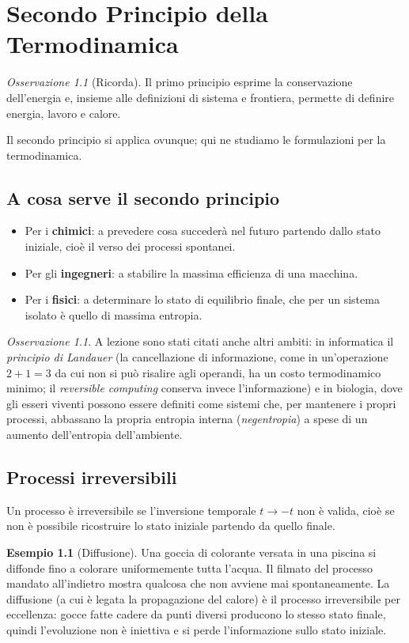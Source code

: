 \documentclass[11pt, a4paper, openright]{book}
\theoremstyle{plain}
\theoremstyle{definition}
\newtheorem{esempio}[teorema]{Esempio}
\theoremstyle{remark}
\newtheorem{osservazione}[teorema]{Osservazione}
\begin{document}
\chapter{Secondo Principio della Termodinamica}
\begin{osservazione}[Ricorda]
    Il primo principio esprime la conservazione dell'energia e, insieme alle definizioni di sistema e frontiera, permette di definire energia, lavoro e calore.
\end{osservazione}
Il secondo principio si applica ovunque; qui ne studiamo le formulazioni per la termodinamica.

\section{A cosa serve il secondo principio}
\begin{itemize}
    \item Per i \textbf{chimici}: a prevedere cosa succederà nel futuro partendo dallo stato iniziale, cioè il verso dei processi spontanei.
    \item Per gli \textbf{ingegneri}: a stabilire la massima efficienza di una macchina.
    \item Per i \textbf{fisici}: a determinare lo stato di equilibrio finale, che per un sistema isolato è quello di massima entropia.
\end{itemize}
\begin{osservazione}
    A lezione sono stati citati anche altri ambiti: in informatica il \emph{principio di Landauer} (la cancellazione di informazione, come in un'operazione $2 + 1 = 3$ da cui non si può risalire agli operandi, ha un costo termodinamico minimo; il \emph{reversible computing} conserva invece l'informazione) e in biologia, dove gli esseri viventi possono essere definiti come sistemi che, per mantenere i propri processi, abbassano la propria entropia interna (\emph{negentropia}) a spese di un aumento dell'entropia dell'ambiente.
\end{osservazione}

\section{Processi irreversibili}
Un processo è irreversibile se l'inversione temporale $t \to -t$ non è valida, cioè se non è possibile ricostruire lo stato iniziale partendo da quello finale.

\begin{esempio}[Diffusione]
    Una goccia di colorante versata in una piscina si diffonde fino a colorare uniformemente tutta l'acqua. Il filmato del processo mandato all'indietro mostra qualcosa che non avviene mai spontaneamente. La diffusione (a cui è legata la propagazione del calore) è il processo irreversibile per eccellenza: gocce fatte cadere da punti diversi producono lo stesso stato finale, quindi l'evoluzione non è iniettiva e si perde l'informazione sullo stato iniziale.
\end{esempio}
\end{document}
